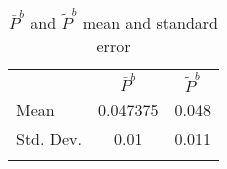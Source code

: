 \begin{table}[h]
\centering
\caption{$\bar{P}^b$ and $\tilde{P}^b$ mean and standard error}\label{tab:pb-comp}
\begin{tabular}{lcc}
 \hline 
 & $\bar{P}^b$ & $\tilde{P}^b$
\hline\\Mean &0.047375 & 0.048\\
Std. Dev. & 0.01&0.011\\\hline\\
       
\end{tabular}
\end{table}

